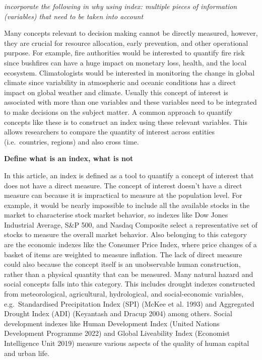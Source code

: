 \documentclass[
]{article}
\begin{document}
\emph{incorporate the following in why using index: multiple pieces of
information (variables) that need to be taken into account}

Many concepts relevant to decision making cannot be directly measured,
however, they are crucial for resource allocation, early prevention, and
other operational purpose. For example, fire authorities would be
interested to quantify fire risk since bushfires can have a huge impact
on monetary loss, health, and the local ecosystem. Climatologists would
be interested in monitoring the change in global climate since
variability in atmospheric and oceanic conditions has a direct impact on
global weather and climate. Usually this concept of interest is
associated with more than one variables and these variables need to be
integrated to make decisions on the subject matter. A common approach to
quantify concepts like these is to construct an index using these
relevant variables. This allows researchers to compare the quantity of
interest across entities (i.e.~countries, regions) and also cross time.

\textbf{Define what is an index, what is not}

In this article, an index is defined as a tool to quantify a concept of
interest that does not have a direct measure. The concept of interest
doesn't have a direct measure can because it is impractical to measure
at the population level. For example, it would be nearly impossible to
include all the available stocks in the market to characterise stock
market behavior, so indexes like Dow Jones Industrial Average, S\&P 500,
and Nasdaq Composite select a representative set of stocks to measure
the overall market behavior. Also belonging to this category are the
economic indexes like the Consumer Price Index, where price changes of a
basket of items are weighted to measure inflation. The lack of direct
measure could also because the concept itself is an unobservable human
construction, rather than a physical quantity that can be measured. Many
natural hazard and social concepts falls into this category. This
includes drought indexes constructed from meteorological, agricultural,
hydrological, and social-economic variables, e.g.~Standardised
Precipitation Index (SPI) (McKee et al. 1993) and Aggregated Drought
Index (ADI) (Keyantash and Dracup 2004) among others. Social development
indexes like Human Development Index (United Nations Development
Programme 2022) and Global Liveability Index (Economist Intelligence
Unit 2019) measure various aspects of the quality of human capital and
urban life.
\end{document}
